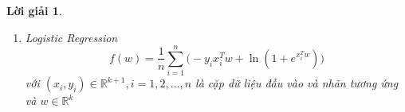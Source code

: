 \documentclass[14pt, a4paper]{article}
\theoremstyle{sltheorem}
\theoremstyle{soltheorem}
\newtheorem*{loigiai}{Lời giải}
\begin{document}
\begin{loigiai}
\begin{enumerate} [wide, labelwidth=!, labelindent=0pt,label=\textbf{\arabic*}.]
            \begin{equation*}
                \nabla \lVert Ax - b \rVert_2^2=\Big \lbrack A^TA + (A^TA)^T \Big \rbrack x-2A^Tb=2A^TAx - 2A^Tb
            \end{equation*}

            Ta tính ma trận Hessian của $\lVert Ax - b \rVert_2^2$ theo $x$:
            \begin{equation*}
                \nabla^2 \lVert Ax - b \rVert_2^2=2A^TA
            \end{equation*}

            Ta xét:

            \begin{equation*}
                2p^TA^TAp=2(Ap)^TAp\geq0 \thickspace \forall p \in \mathbb{R}^{n} \Rightarrow 2A^TA \succeq 0 \thickspace \forall x \in \mathbb{R}^{n}
            \end{equation*}

            Mặt khác, $\mathrm{dom}(\lVert Ax - b \rVert_2^2)=\mathbb{R}^n$ là tập lồi. Vậy nên $\lVert Ax - b \rVert_2^2$ là hàm lồi

            Ta chứng minh $\lVert x \rVert_1$ là hàm lồi, với $\theta \in \lbrack 0, 1\rbrack, x,y \in \mathbb{R}^n$:

            \begin{equation*}
                \begin{aligned}
                    \lVert \theta x + (1-\theta)y \rVert_1 \leq \theta \lVert x \rVert_1 + (1-\theta)\lVert y \rVert_1 \thickspace \forall \thickspace \theta \in \lbrack 0, 1 \rbrack, x, y \in \mathbb{R}^n
                \end{aligned}
            \end{equation*}

            theo bất đẳng thức tam giác và $\mathrm{dom}(\lVert x \rVert_1)=\mathbb{R}^n$ là tập lồi nên $\lVert x \rVert_1$ là hàm lồi. 
            $\mathrm{dom}(f)$ là một tập lồi và tổng $\lVert Ax - b \rVert_2^2 + \lambda \lVert x \rVert_1 \thickspace (\lambda \geq 0)$ có các thành phần $\lVert Ax - b \rVert_2^2$ và $\lVert x \rVert_1$ lồi nên $f(x)$ là một hàm lồi.

            \item Logistic Regression
            \begin{equation*}
                f(w)=\dfrac{1}{n}\sum_{i=1}^n \Big( -y_i x_i^T w + \ln(1 + e^{x_i^T w}) \Big)
            \end{equation*}
            với $(x_i, y_i) \in \mathbb{R}^{k+1},i=1,2,\dots,n$ là cặp dữ liệu đầu vào và nhãn tương ứng và $w \in \mathbb{R}^k$


\end{enumerate}
\end{loigiai}
\end{document}
